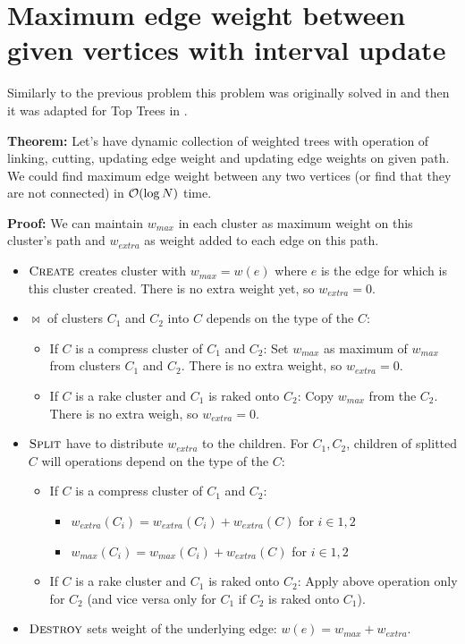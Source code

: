 
\section{Maximum edge weight between given vertices with interval update}
\label{sec:maximum_edge_weight}

Similarly to the previous problem this problem was originally solved in
\cite{DSforDynamicTrees} and then it was adapted for Top Trees  in
\cite{TopTrees}.

{\bf Theorem:} Let's have dynamic collection of weighted trees with operation of linking,
cutting, updating edge weight and updating edge weights on given path. We could
find maximum edge weight between any two vertices (or find that they are not
connected) in ${\cal O}(\log N)$ time.

\medskip\noindent
{\bf Proof:} We can maintain $w_{max}$ in each cluster as maximum weight on this
cluster's path and $w_{extra}$ as weight added to each edge on this path.

\begin{itemize}

\item $\hbox{\sc Create}$ creates cluster with $w_{max}=w(e)$ where $e$ is the edge for
which is this cluster created. There is no extra weight yet, so $w_{extra}=0$.

\item $\Join$ of clusters $C_1$ and $C_2$ into $C$ depends on the type of the $C$:
	\begin{itemize}
	\item If $C$ is a compress cluster of $C_1$ and $C_2$:
	Set $w_{max}$ as maximum of $w_{max}$ from clusters $C_1$ and $C_2$.
	There is no extra weight, so $w_{extra}=0$.
	\item If $C$ is a rake cluster and $C_1$ is raked onto $C_2$:
	Copy $w_{max}$ from the $C_2$. There is no extra weigh, so $w_{extra}=0$.
	\end{itemize}

\item $\hbox{\sc Split}$ have to distribute $w_{extra}$ to the children. For $C_1, C_2$,  children
of splitted $C$ will operations depend on the type of the $C$:
	\begin{itemize}
	\item If $C$ is a compress cluster of $C_1$ and $C_2$:
		\begin{itemize}[$\circ$]
		\item $w_{extra}(C_i)=w_{extra}(C_i)+w_{extra}(C)$ for $i\in{1,2}$
		\item $w_{max}(C_i)=w_{max}(C_i)+w_{extra}(C)$ for $i\in{1,2}$
		\end{itemize}
	\item If $C$ is a rake cluster and $C_1$ is raked onto $C_2$:
	Apply above operation only for $C_2$ (and vice versa only for $C_1$ if $C_2$
	is raked onto $C_1$).
	\end{itemize}


\item $\hbox{\sc Destroy}$ sets weight of the underlying edge: $w(e)=w_{max}+w_{extra}$.

\end{itemize}


